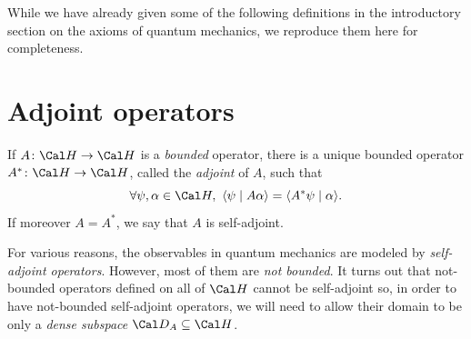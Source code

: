 
While we have already given some of the following definitions in the
introductory section on the axioms of quantum mechanics, we reproduce
them here for completeness.

\section{Adjoint operators}

If \(A\colon\Cal H\to\Cal H\) is a \emph{bounded} operator,
there is a unique bounded operator \(A^*\colon\Cal H\to\Cal H\),
called the \emph{adjoint} of \(A\), such that
\begin{equation}
  \forall \psi,\alpha\in\Cal H,\
  \langle \psi\mid A\alpha\rangle
  =
  \langle A^*\psi\mid \alpha\rangle.
\end{equation}
If moreover \(A=A^*\), we say that \(A\) is self-adjoint.

For various reasons, the observables in quantum mechanics are modeled
by \emph{self-adjoint operators}.
However, most of them are \emph{not bounded}.
It turns out that not-bounded operators defined on all of
\(\Cal H\) cannot be self-adjoint so, in order to have not-bounded
self-adjoint operators, we will need to allow their domain to be
only a \emph{dense subspace} \(\Cal D_A\subseteq\Cal H\).

